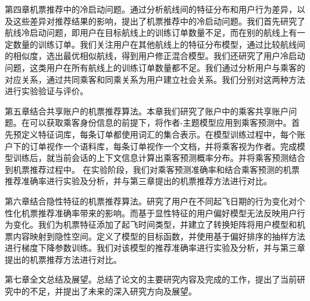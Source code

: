 第四章机票推荐中的冷启动问题。通过分析航线间的特征分布和用户行为差异，以及这些差异对推荐结果的影响，提出了机票推荐中的冷启动问题。我们首先研究了航线冷启动问题，即用户在目标航线上的训练订单数量不足，而在别的航线上有一定数量的训练订单。我们关注用户在其他航线上的特征分布模型，通过比较航线间的相似度，选出最优相似航线，得到用户修正混合模型。我们还研究了用户冷启动问题，这类用户在所有航线上的训练订单数量都不足。我们通过分析用户与乘客的对应关系，通过共同乘客和同乘关系为用户建立社会关系。我们分别对这两种方法进行实验验证与评价。

第五章结合共享账户的机票推荐算法。本章我们研究了账户中的乘客共享账户问题。在可以获取乘客身份信息的前提下，将作者-主题模型应用到乘客预测中。首先预定义特征词库，每条订单都使用词汇的集合表示。在模型训练过程中，每个账户下的订单视作一个语料库，每条订单视作一个文档，并将乘客视为作者。完成模型训练后，就当前会话的上下文信息计算出乘客预测概率分布。并将乘客预测结合到机票推荐过程中。
在实验阶段，我们对乘客预测准确率和结合乘客预测的机票推荐准确率进行实验及分析，并与第三章提出的机票推荐方法进行对比。

第六章结合隐性特征的机票推荐算法。研究了用户在不同起飞日期的行为变化对个性化机票推荐准确率带来的影响。而基于显性特征的用户偏好模型无法反映用户行为变化。我们为机票特征添加了起飞时间类型，并建立了转换矩阵将用户模型和机票内容映射到隐性空间。定义了模型的目标函数，并使用基于偏好排序的抽样方法进行梯度下降参数训练。我们对该模型的推荐准确率进行实验及分析，并与第三章提出的机票推荐方法进行对比。

第七章全文总结及展望。总结了论文的主要研究内容及完成的工作，提出了当前研究中的不足，并提出了未来的深入研究方向及展望。